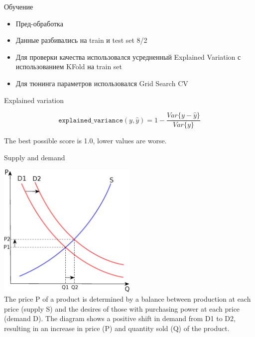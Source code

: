 \documentclass[14pt,mathserif,aspectratio=43]{beamer}
\begin{document}

\begin{frame}[label=learning]{Обучение}

    \begin{itemize}
        \item Пред-обработка
        \item Данные разбивались на train и test set 8/2
        \item Для проверки качества использовался усредненный Explained Variation с использованием KFold на train set
        \item Для тюнинга параметров использовался Grid Search CV
    \end{itemize}
    
    \hyperlink{model}{}

\end{frame}


\begin{frame}[label=ev]{Explained variation}

    $$
        \texttt{explained\_{}variance}(y, \hat{y}) = 1 - \frac{Var\{ y - \hat{y}\}}{Var\{y\}}
    $$
    
    The best possible score is 1.0, lower values are worse.
    
    \hyperlink{model}{}

\end{frame}


\begin{frame}[label=sad]{Supply and demand}

    \begin{center}
        \includegraphics[width=0.5\textwidth]{Supply-and-demand.eps} \\
        \footnotesize{The price P of a product is determined by a balance between production at each price (supply S) and the desires of those with purchasing power at each price (demand D). The diagram shows a positive shift in demand from D1 to D2, resulting in an increase in price (P) and quantity sold (Q) of the product.}
    \end{center}
    
    \hyperlink{target}{}

\end{frame}

\end{document}
